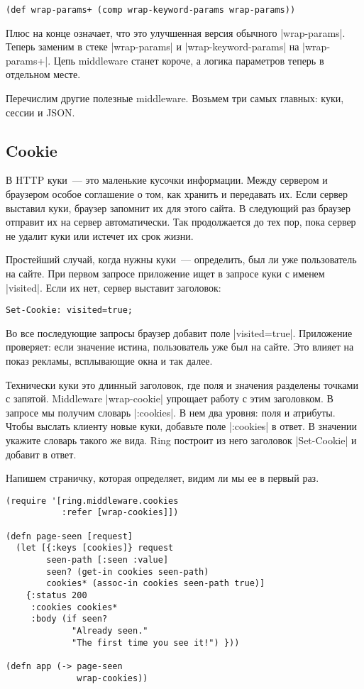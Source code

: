 \begin{verbatim}
(def wrap-params+ (comp wrap-keyword-params wrap-params))
\end{verbatim}

Плюс на конце означает, что это улучшенная версия обычного \spverb|wrap-params|. Теперь
заменим в стеке \spverb|wrap-params| и \spverb|wrap-keyword-params| на \spverb|wrap-params+|. Цепь
middleware станет короче, а логика параметров теперь в отдельном месте.

Перечислим другие полезные middleware. Возьмем три самых главных: куки, сессии и
JSON.

\subsection{Cookie}

В HTTP куки~--- это маленькие кусочки информации. Между сервером и браузером
особое соглашение о том, как хранить и передавать их. Если сервер выставил куки,
браузер запомнит их для этого сайта. В следующий раз браузер отправит их на
сервер автоматически. Так продолжается до тех пор, пока сервер не удалит куки
или истечет их срок жизни.

Простейший случай, когда нужны куки~--- определить, был ли уже пользователь на
сайте. При первом запросе приложение ищет в запросе куки с именем
\spverb|visited|. Если их нет, сервер выставит заголовок:

\begin{verbatim}
Set-Cookie: visited=true;
\end{verbatim}

Во все последующие запросы браузер добавит поле \spverb|visited=true|.
Приложение проверяет: если значение истина, пользователь уже был на сайте.
Это влияет на показ рекламы, всплывающие окна и так далее.

Технически куки это длинный заголовок, где поля и значения разделены точками с
запятой. Middleware \spverb|wrap-cookie| упрощает работу с этим заголовком. В
запросе мы получим словарь \spverb|:cookies|. В нем два уровня: поля и
атрибуты. Чтобы выслать клиенту новые куки, добавьте поле \spverb|:cookies| в
ответ. В значении укажите словарь такого же вида. Ring построит из него
заголовок \spverb|Set-Cookie| и добавит в ответ.

Напишем страничку, которая определяет, видим ли мы ее в первый раз.

\begin{verbatim}
(require '[ring.middleware.cookies
           :refer [wrap-cookies]])

(defn page-seen [request]
  (let [{:keys [cookies]} request
        seen-path [:seen :value]
        seen? (get-in cookies seen-path)
        cookies* (assoc-in cookies seen-path true)]
    {:status 200
     :cookies cookies*
     :body (if seen?
             "Already seen."
             "The first time you see it!") }))

(defn app (-> page-seen
              wrap-cookies))
\end{verbatim}

